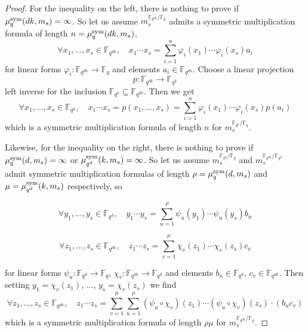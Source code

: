\begin{proof}
For the inequality on the left, there is nothing to prove if $\mu^{\textrm{sym}}_q(dk,m_s)=\infty$.
So let us assume $m_s^{\mathbb{F}_{q^{dk}}/\mathbb{F}_{q}}$ admits a symmetric multiplication formula of length $n=\mu^{\textrm{sym}}_q(dk,m_s)$, \ie
\[\forall x_1,\dots,x_s\in\mathbb{F}_{q^{dk}},\quad x_1\cdots x_s = \sum_{i=1}^{n}\varphi_i(x_1)\cdots\varphi_i(x_s)a_i \]
for linear forms $\varphi_i:\mathbb{F}_{q^{dk}}\to\mathbb{F}_{q}$ and elements $a_i\in\mathbb{F}_{q^{dk}}$.
Choose a linear projection
\[ p:\mathbb{F}_{q^{dk}}\to\mathbb{F}_{q^{k}} \]
left inverse for the inclusion $\mathbb{F}_{q^{k}}\subseteq\mathbb{F}_{q^{dk}}$.
Then we get
\[\forall x_1,\dots,x_s\in\mathbb{F}_{q^{k}},\quad x_1\cdots x_s = p(x_1,\dots,x_s) = \sum_{i=1}^{n}\varphi_i(x_1)\cdots\varphi_i(x_s)p(a_i) \]
which is a symmetric multiplication formula of length $n$ for $m_s^{\mathbb{F}_{q^{k}}/\mathbb{F}_{q}}$.

Likewise, for the inequality on the right, there is nothing to prove if $\mu^{\textrm{sym}}_q(d,m_s)=\infty$ or $\mu^{\textrm{sym}}_{q^d}(k,m_s)=\infty$.
So let us assume $m_s^{\mathbb{F}_{q^{d}}/\mathbb{F}_{q}}$ and
$m_s^{\mathbb{F}_{q^{dk}}/\mathbb{F}_{q^{d}}}$ admit symmetric multiplication
formulas of length $\rho=\mu^{\textrm{sym}}_q(d,m_s)$ and $\mu=\mu^{\textrm{sym}}_{q^d}(k,m_s)$ respectively, so
\vspace{-.5\baselineskip}

\[\forall y_1,\dots,y_s\in\mathbb{F}_{q^{d}},\quad y_1\cdots y_s =
\sum_{u=1}^{\rho}\psi_u(y_1)\cdots\psi_u(y_s)b_u \]
\vspace{-1.5\baselineskip}

\[\forall z_1,\dots,z_s\in\mathbb{F}_{q^{dk}},\quad z_1\cdots z_s =
\sum_{v=1}^{\mu}\chi_v(z_1)\cdots\chi_v(z_s)c_v \]
\vspace{-.5\baselineskip}

\noindent for linear forms $\psi_u:\mathbb{F}_{q^{d}}\to\mathbb{F}_{q}$, $\chi_v:\mathbb{F}_{q^{dk}}\to\mathbb{F}_{q^{d}}$ and elements $b_u\in\mathbb{F}_{q^{d}}$, $c_v\in\mathbb{F}_{q^{dk}}$.
Then setting $y_1=\chi_v(z_1)$, ..., $y_s=\chi_v(z_s)$ we find
\[\forall z_1,\dots,z_s\in\mathbb{F}_{q^{dk}},\quad z_1\cdots z_s =
\sum_{v=1}^{\mu}\sum_{u=1}^{\rho}(\psi_u\circ\chi_v)(z_1)\cdots(\psi_u\circ\chi_v)(z_s)\cdot(b_uc_v) \]
which is a symmetric multiplication formula of length $\rho\mu$ for $m_s^{\mathbb{F}_{q^{dk}}/\mathbb{F}_{q}}$.
\end{proof}


